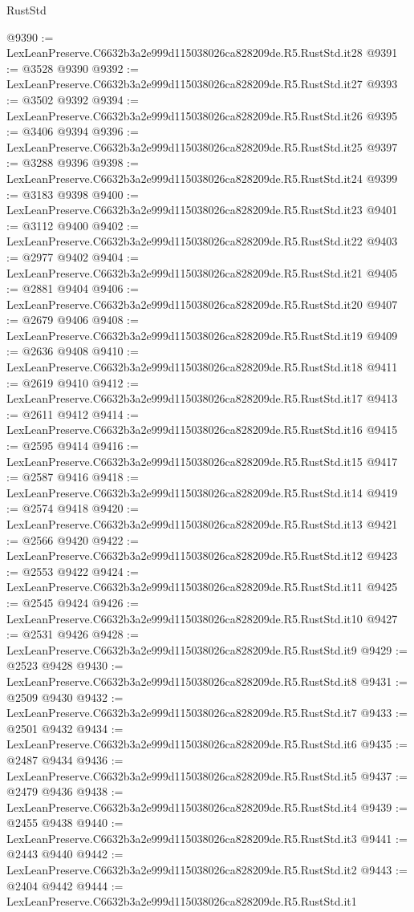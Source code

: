 \begin{lexlean}{RustStd}
\begin{coremodule}
@9390 := LexLeanPreserve.C6632b3a2e999d115038026ca828209de.R5.RustStd.it28
@9391 := @3528 @9390
@9392 := LexLeanPreserve.C6632b3a2e999d115038026ca828209de.R5.RustStd.it27
@9393 := @3502 @9392
@9394 := LexLeanPreserve.C6632b3a2e999d115038026ca828209de.R5.RustStd.it26
@9395 := @3406 @9394
@9396 := LexLeanPreserve.C6632b3a2e999d115038026ca828209de.R5.RustStd.it25
@9397 := @3288 @9396
@9398 := LexLeanPreserve.C6632b3a2e999d115038026ca828209de.R5.RustStd.it24
@9399 := @3183 @9398
@9400 := LexLeanPreserve.C6632b3a2e999d115038026ca828209de.R5.RustStd.it23
@9401 := @3112 @9400
@9402 := LexLeanPreserve.C6632b3a2e999d115038026ca828209de.R5.RustStd.it22
@9403 := @2977 @9402
@9404 := LexLeanPreserve.C6632b3a2e999d115038026ca828209de.R5.RustStd.it21
@9405 := @2881 @9404
@9406 := LexLeanPreserve.C6632b3a2e999d115038026ca828209de.R5.RustStd.it20
@9407 := @2679 @9406
@9408 := LexLeanPreserve.C6632b3a2e999d115038026ca828209de.R5.RustStd.it19
@9409 := @2636 @9408
@9410 := LexLeanPreserve.C6632b3a2e999d115038026ca828209de.R5.RustStd.it18
@9411 := @2619 @9410
@9412 := LexLeanPreserve.C6632b3a2e999d115038026ca828209de.R5.RustStd.it17
@9413 := @2611 @9412
@9414 := LexLeanPreserve.C6632b3a2e999d115038026ca828209de.R5.RustStd.it16
@9415 := @2595 @9414
@9416 := LexLeanPreserve.C6632b3a2e999d115038026ca828209de.R5.RustStd.it15
@9417 := @2587 @9416
@9418 := LexLeanPreserve.C6632b3a2e999d115038026ca828209de.R5.RustStd.it14
@9419 := @2574 @9418
@9420 := LexLeanPreserve.C6632b3a2e999d115038026ca828209de.R5.RustStd.it13
@9421 := @2566 @9420
@9422 := LexLeanPreserve.C6632b3a2e999d115038026ca828209de.R5.RustStd.it12
@9423 := @2553 @9422
@9424 := LexLeanPreserve.C6632b3a2e999d115038026ca828209de.R5.RustStd.it11
@9425 := @2545 @9424
@9426 := LexLeanPreserve.C6632b3a2e999d115038026ca828209de.R5.RustStd.it10
@9427 := @2531 @9426
@9428 := LexLeanPreserve.C6632b3a2e999d115038026ca828209de.R5.RustStd.it9
@9429 := @2523 @9428
@9430 := LexLeanPreserve.C6632b3a2e999d115038026ca828209de.R5.RustStd.it8
@9431 := @2509 @9430
@9432 := LexLeanPreserve.C6632b3a2e999d115038026ca828209de.R5.RustStd.it7
@9433 := @2501 @9432
@9434 := LexLeanPreserve.C6632b3a2e999d115038026ca828209de.R5.RustStd.it6
@9435 := @2487 @9434
@9436 := LexLeanPreserve.C6632b3a2e999d115038026ca828209de.R5.RustStd.it5
@9437 := @2479 @9436
@9438 := LexLeanPreserve.C6632b3a2e999d115038026ca828209de.R5.RustStd.it4
@9439 := @2455 @9438
@9440 := LexLeanPreserve.C6632b3a2e999d115038026ca828209de.R5.RustStd.it3
@9441 := @2443 @9440
@9442 := LexLeanPreserve.C6632b3a2e999d115038026ca828209de.R5.RustStd.it2
@9443 := @2404 @9442
@9444 := LexLeanPreserve.C6632b3a2e999d115038026ca828209de.R5.RustStd.it1

\end{coremodule}
\end{lexlean}

